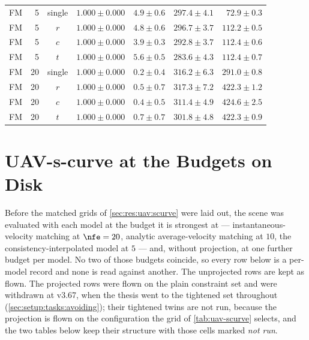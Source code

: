\begin{table}[htpb]
\begin{tabularx}{\linewidth}{@{}L r c rrrr@{}}
    \addlinespace[2pt]
    FM & 5 & single & $1.000 \pm 0.000$ & $4.9 \pm 0.6$ & $297.4 \pm 4.1$ & $72.9 \pm 0.3$ \\
    FM & 5 & $r$ & $1.000 \pm 0.000$ & $4.8 \pm 0.6$ & $296.7 \pm 3.7$ & $112.2 \pm 0.5$ \\
    FM & 5 & $c$ & $1.000 \pm 0.000$ & $3.9 \pm 0.3$ & $292.8 \pm 3.7$ & $112.4 \pm 0.6$ \\
    FM & 5 & $t$ & $1.000 \pm 0.000$ & $5.6 \pm 0.5$ & $283.6 \pm 4.3$ & $112.4 \pm 0.7$ \\
    \addlinespace[2pt]
    FM & 20 & single & $1.000 \pm 0.000$ & $0.2 \pm 0.4$ & $316.2 \pm 6.3$ & $291.0 \pm 0.8$ \\
    FM & 20 & $r$ & $1.000 \pm 0.000$ & $0.5 \pm 0.7$ & $317.3 \pm 7.2$ & $422.3 \pm 1.2$ \\
    FM & 20 & $c$ & $1.000 \pm 0.000$ & $0.4 \pm 0.5$ & $311.4 \pm 4.9$ & $424.6 \pm 2.5$ \\
    FM & 20 & $t$ & $1.000 \pm 0.000$ & $0.7 \pm 0.7$ & $301.8 \pm 4.8$ & $422.3 \pm 0.9$ \\
    \bottomrule
  \end{tabularx}
\end{table}

\FloatBarrier

\section{UAV-s-curve at the Budgets on Disk}\label{app:uav-scurve-budgets}


Before the matched grids of \autoref{sec:res:uav:scurve} were laid out, the scene was evaluated with
each model at the budget it is strongest at --- instantaneous-velocity matching at $\nfe=20$, analytic
average-velocity matching at $10$, the consistency-interpolated model at $5$ --- and, without projection,
at one further budget per model. No two of those budgets coincide, so every row below is a per-model
record and none is read against another. The unprojected rows are kept as flown. The projected rows were
flown on the plain constraint set and were withdrawn at v3.67, when the thesis went to the tightened set
throughout (\autoref{sec:setup:tasks:avoiding}); their tightened twins are not run, because
the projection is flown on the configuration the grid of \autoref{tab:uav-scurve} selects, and the two
tables below keep their structure with those cells marked \emph{not run}.

